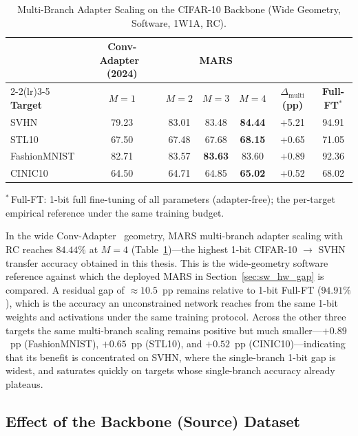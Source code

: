 \documentclass[12pt, a4paper]{report}
\numberwithin{equation}{chapter}
\numberwithin{figure}{chapter}
\numberwithin{table}{chapter}
\numberwithin{algorithm}{chapter}
\begin{document}
\begin{table}[H]
\centering
\caption{Multi-Branch Adapter Scaling on the CIFAR-10 Backbone (Wide Geometry, Software, 1W1A, RC).}
\label{tab:multi_adapter_sw}
\small
\setlength{\tabcolsep}{4pt}%
\begin{tabular}{lcccccc}
\toprule
 & \textbf{Conv-Adapter}~\cite{Chen2024ConvAdapter} (2024) & \multicolumn{3}{c}{\textbf{MARS}} & & \\
\cmidrule(lr){2-2}\cmidrule(lr){3-5}
\textbf{Target} & \textbf{$M{=}1$} & \textbf{$M{=}2$} & \textbf{$M{=}3$} & \textbf{$M{=}4$} & \textbf{$\Delta_{\text{multi}}$ (pp)} & \textbf{Full-FT}$^{*}$ \\
\midrule
SVHN         & 79.23 & 83.01 & 83.48 & \textbf{84.44} & +5.21 & 94.91 \\
STL10        & 67.50 & 67.48 & 67.68 & \textbf{68.15} & +0.65 & 71.05 \\
FashionMNIST & 82.71 & 83.57 & \textbf{83.63} & 83.60 & +0.89 & 92.36 \\
CINIC10      & 64.50 & 64.71 & 64.85 & \textbf{65.02} & +0.52 & 68.02 \\
\bottomrule
\end{tabular}

\vspace{2pt}
{\footnotesize $^{*}$\,Full-FT: 1-bit full fine-tuning of all parameters (adapter-free); the per-target empirical reference under the same training budget.}
\end{table}

In the wide Conv-Adapter~\cite{Chen2024ConvAdapter} geometry, MARS multi-branch adapter scaling with RC reaches $84.44\%$ at $M=4$ (Table~\ref{tab:multi_adapter_sw})---the highest 1-bit CIFAR-10 $\to$ SVHN transfer accuracy obtained in this thesis. This is the wide-geometry software reference against which the deployed MARS in Section~\ref{sec:sw_hw_gap} is compared. A residual gap of $\approx 10.5$~pp remains relative to 1-bit Full-FT ($94.91\%$), which is the accuracy an unconstrained network reaches from the same 1-bit weights and activations under the same training protocol. Across the other three targets the same multi-branch scaling remains positive but much smaller---$+0.89$~pp (FashionMNIST), $+0.65$~pp (STL10), and $+0.52$~pp (CINIC10)---indicating that its benefit is concentrated on SVHN, where the single-branch 1-bit gap is widest, and saturates quickly on targets whose single-branch accuracy already plateaus.

\subsection{Effect of the Backbone (Source) Dataset}
\label{sec:backbone_effect}
\end{document}
